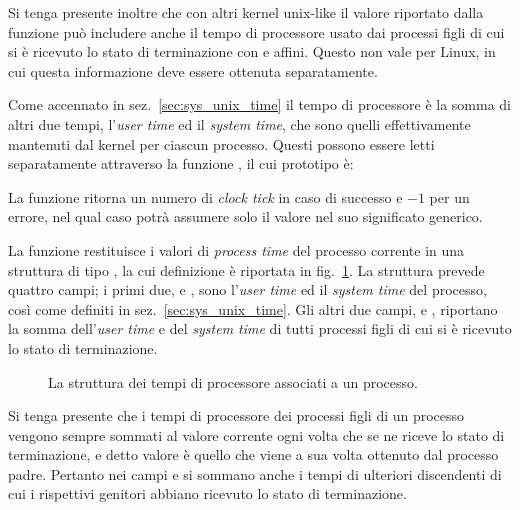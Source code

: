 Si tenga presente inoltre che con altri kernel unix-like il valore riportato
dalla funzione può includere anche il tempo di processore usato dai processi
figli di cui si è ricevuto lo stato di terminazione con  e
affini. Questo non vale per Linux, in cui questa informazione deve essere
ottenuta separatamente.

Come accennato in sez.~\ref{sec:sys_unix_time} il tempo di processore è la
somma di altri due tempi, l'\textit{user time} ed il \textit{system time}, che
sono quelli effettivamente mantenuti dal kernel per ciascun processo. Questi
possono essere letti separatamente attraverso la funzione , il
cui prototipo è:

\begin{funcproto}{
}

{La funzione ritorna un numero di \textit{clock tick} in caso di successo e
  $-1$ per un errore, nel qual caso  potrà assumere solo il valore
   nel suo significato generico.}
\end{funcproto} 

La funzione restituisce i valori di \textit{process time} del processo
corrente in una struttura di tipo , la cui definizione è riportata
in fig.~\ref{fig:sys_tms_struct}. La struttura prevede quattro campi; i primi
due,  e , sono l'\textit{user time} ed il
\textit{system time} del processo, così come definiti in
sez.~\ref{sec:sys_unix_time}.  Gli altri due campi,  e
, riportano la somma dell'\textit{user time} e del
\textit{system time} di tutti processi figli di cui si è ricevuto lo stato di
terminazione. 

\begin{figure}[!htb]
  \footnotesize
  \centering
  \begin{minipage}[c]{0.8\textwidth}
  \end{minipage} 
  \normalsize 
  \caption{La struttura  dei tempi di processore associati a un
    processo.} 
  \label{fig:sys_tms_struct}
\end{figure}


Si tenga presente che i tempi di processore dei processi figli di un processo
vengono sempre sommati al valore corrente ogni volta che se ne riceve lo stato
di terminazione, e detto valore è quello che viene a sua volta ottenuto dal
processo padre. Pertanto nei campi  e  si
sommano anche i tempi di ulteriori discendenti di cui i rispettivi genitori
abbiano ricevuto lo stato di terminazione.

